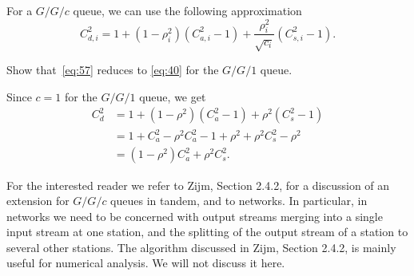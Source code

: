 For a $G/G/c$ queue, we can use the following approximation
\begin{equation}\label{eq:57}
  C_{d,i}^2 = 1 + (1-\rho_i^2)(C_{a,i}^2-1) + \frac{\rho_i^2}{\sqrt{c_i}}(C_{s,i}^2-1).
\end{equation}

\begin{exercise}
  Show that~\cref{eq:57} reduces to \cref{eq:40} for the $G/G/1$ queue.
  \begin{solution}
    Since $c=1$ for the $G/G/1$ queue, we get
\begin{align*}
  C_{d}^2 
&= 1 + (1-\rho^2)(C_{a}^2-1) + \rho^2(C_{s}^2-1) \\
&= 1 + C_a^2 - \rho^2 C_{a}^2 -1 + \rho^2  + \rho^2 C_{s}^2 -\rho^2 \\
&= (1-\rho^2) C_a^2  + \rho^2 C_{s}^2.
\end{align*}
  \end{solution}
\end{exercise}


For the interested reader we refer to Zijm, Section 2.4.2, for a discussion of an extension for $G/G/c$ queues in tandem, and to networks. In particular, in networks we need to be concerned with output streams merging into a single input stream at one station, and the splitting of the output stream of a station to several other stations. The algorithm discussed in Zijm, Section 2.4.2, is mainly useful for numerical analysis. We will not discuss it here. 







